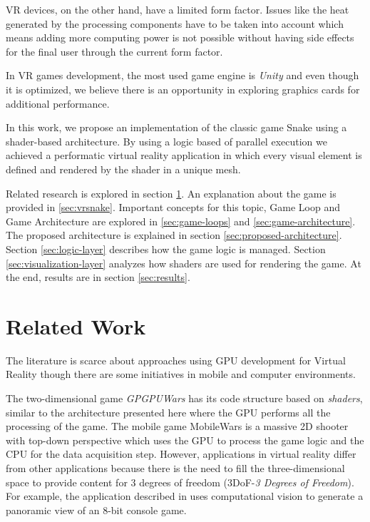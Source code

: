 \documentclass[runningheads]{llncs}
\begin{document}
VR devices, on the other hand, have a limited form factor. Issues like the heat generated by the processing components have to be taken into account which means adding more computing power is not possible without having side effects for the final user through the current form factor.

In VR games development, the most used game engine is \textit{Unity} \cite{Unity} and even though it is optimized, we believe there is an opportunity in exploring graphics cards for additional performance.

In this work, we propose an implementation of the classic game Snake using a shader-based architecture. By using a logic based of parallel execution we achieved a performatic virtual reality application in which every visual element is defined and rendered by the shader in a unique mesh.

Related research is explored in section \ref{sec:related-works}. An explanation about the game is provided in \ref{sec:vrsnake}. Important concepts for this topic, Game Loop and Game Architecture are explored in \ref{sec:game-loops} and \ref{sec:game-architecture}. The proposed architecture is explained in section \ref{sec:proposed-architecture}. Section \ref{sec:logic-layer} describes how the game logic is managed. Section \ref{sec:visualization-layer} analyzes how shaders are used for rendering the game.  At the end, results are in section \ref{sec:results}.


\section{Related Work} \label{sec:related-works}

The literature is scarce about approaches using GPU development for Virtual Reality though there are some initiatives in mobile and computer environments.


The two-dimensional game \textit{GPGPUWars} \cite{joselli2009gpuwars} has its code structure based on \textit{shaders}, similar to the architecture presented here where the GPU performs all the processing of the game. The mobile game MobileWars is a massive 2D shooter with top-down perspective \cite{MobileWars} which uses the GPU to process the game logic and the CPU for the data acquisition step. However, applications in virtual reality differ from other applications because there is the need to fill the three-dimensional space to provide content for 3 degrees of freedom (3DoF-\textit{3 Degrees of Freedom}). For example, the application described in \cite{zund2015unfolding} uses computational vision to generate a panoramic view of an 8-bit console game.
\end{document}
